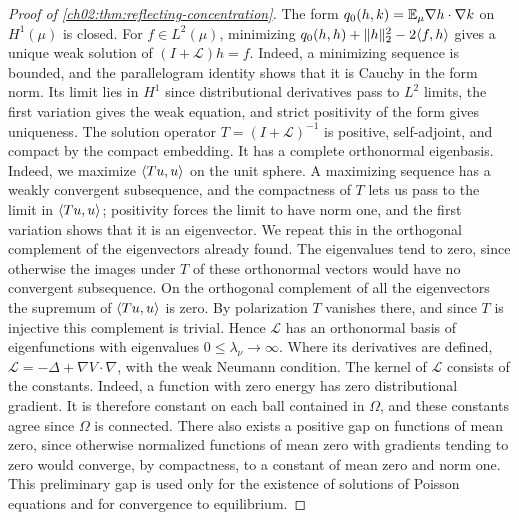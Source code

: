 \begin{proof}[Proof of \cref{ch02:thm:reflecting-concentration}]
The form $q_0(h,k)=\mathbb E_\mu\nabla h\cdot\nabla k$ on $H^1(\mu)$ is closed. For $f\in L^2(\mu)$, minimizing $q_0(h,h)+\lVert h\rVert_2^2-2\langle f,h\rangle$ gives a unique weak solution of $(I+\mathcal L)h=f$. Indeed, a minimizing sequence is bounded, and the parallelogram identity shows that it is Cauchy in the form norm. Its limit lies in $H^1$ since distributional derivatives pass to $L^2$ limits, the first variation gives the weak equation, and strict positivity of the form gives uniqueness. The solution operator $T=(I+\mathcal L)^{-1}$ is positive, self-adjoint, and compact by the compact embedding. It has a complete orthonormal eigenbasis. Indeed, we maximize $\langle Tu,u\rangle$ on the unit sphere. A maximizing sequence has a weakly convergent subsequence, and the compactness of $T$ lets us pass to the limit in $\langle Tu,u\rangle$; positivity forces the limit to have norm one, and the first variation shows that it is an eigenvector. We repeat this in the orthogonal complement of the eigenvectors already found. The eigenvalues tend to zero, since otherwise the images under $T$ of these orthonormal vectors would have no convergent subsequence. On the orthogonal complement of all the eigenvectors the supremum of $\langle Tu,u\rangle$ is zero. By polarization $T$ vanishes there, and since $T$ is injective this complement is trivial. Hence $\mathcal L$ has an orthonormal basis of eigenfunctions with eigenvalues $0\le\lambda_\nu\to\infty$. Where its derivatives are defined, $\mathcal L=-\Delta+\nabla V\cdot\nabla$, with the weak Neumann condition. The kernel of $\mathcal L$ consists of the constants. Indeed, a function with zero energy has zero distributional gradient. It is therefore constant on each ball contained in $\Omega$, and these constants agree since $\Omega$ is connected. There also exists a positive gap on functions of mean zero, since otherwise normalized functions of mean zero with gradients tending to zero would converge, by compactness, to a constant of mean zero and norm one. This preliminary gap is used only for the existence of solutions of Poisson equations and for convergence to equilibrium.


\end{proof}
